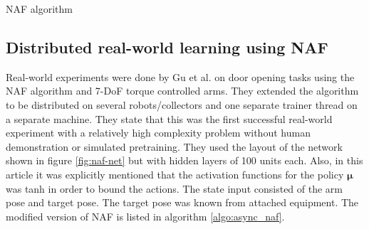 \begin{algorithm}[!h]
    \caption{NAF algorithm}
    \begin{algorithmic}
                \ENDFOR
            \ENDFOR
        \ENDFOR
    \end{algorithmic}
    \label{algo:naf}
\end{algorithm}

\subsection{Distributed real-world learning using NAF}

Real-world experiments were done by Gu et al. \cite{gu2016deep} on door opening
tasks using the NAF algorithm and 7-DoF torque controlled arms. They extended
the algorithm to be distributed on several robots/collectors and one separate
trainer thread on a separate machine. They state that this was the first
successful real-world experiment with a relatively high complexity problem
without human demonstration or simulated pretraining. They used the layout of
the network shown in figure \ref{fig:naf-net} but with hidden layers of 100
units each. Also, in this article it was explicitly mentioned that the
activation functions for the policy $\mathbf{\mu}$ was tanh in order to bound
the actions. The state input consisted of the arm pose and target pose. The
target pose was known from attached equipment. The modified version of NAF is
listed in algorithm \ref{algo:async_naf}.

